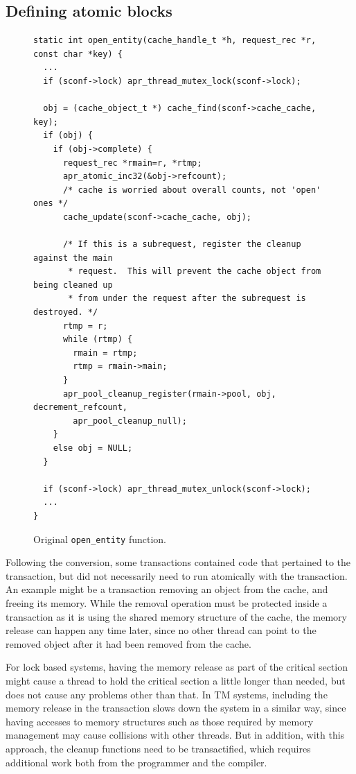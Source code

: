 \documentclass[11pt]{sigplanconf}
\begin{document}
\subsection{Defining atomic blocks}
\begin{figure}
\begin{lstlisting}
static int open_entity(cache_handle_t *h, request_rec *r, const char *key) {
  ...
  if (sconf->lock) apr_thread_mutex_lock(sconf->lock);

  obj = (cache_object_t *) cache_find(sconf->cache_cache, key);
  if (obj) {
    if (obj->complete) {
      request_rec *rmain=r, *rtmp;
      apr_atomic_inc32(&obj->refcount);
      /* cache is worried about overall counts, not 'open' ones */
      cache_update(sconf->cache_cache, obj);

      /* If this is a subrequest, register the cleanup against the main
       * request.  This will prevent the cache object from being cleaned up
       * from under the request after the subrequest is destroyed. */
      rtmp = r;
      while (rtmp) {
        rmain = rtmp;
        rtmp = rmain->main;
      }
      apr_pool_cleanup_register(rmain->pool, obj, decrement_refcount, 
        apr_pool_cleanup_null);
    }
    else obj = NULL;
  }

  if (sconf->lock) apr_thread_mutex_unlock(sconf->lock);
  ...
}
\end{lstlisting}
\caption{Original {\tt open\_entity} function.}
\label{code:original-open-entity}
\end{figure}

Following the conversion, some transactions contained code that pertained to
the transaction, but did not necessarily need to run atomically with the
transaction. An example might be a transaction removing an object from the
cache, and freeing its memory. While the removal operation must be protected
inside a transaction as it is using the shared memory structure of the cache,
the memory release can happen any time later, since no other thread can point to
the removed object after it had been removed from the cache. 

For lock based systems, having the memory release as part of the critical
section might cause a thread to hold the critical section a little longer than
needed, but does not cause any problems other than that. In TM
systems, including the memory release in the transaction slows down
the system in a similar way, since
having accesses to memory structures such as those required by
memory management may cause collisions with other threads. But 
in addition, with this approach, the cleanup functions need to be
transactified, which requires additional work both from the programmer and the
compiler.
\end{document}

